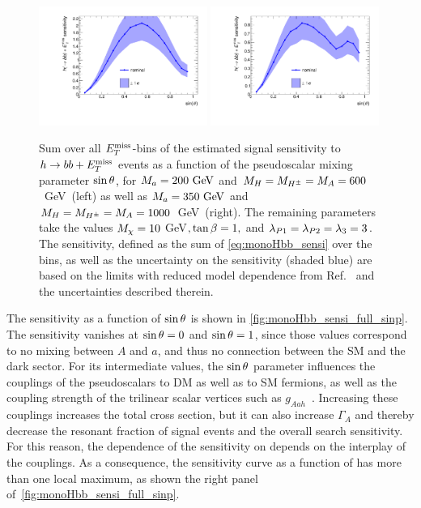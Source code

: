 \begin{figure}[tbp]
\centering
\includegraphics[width=0.49\textwidth]{texinputs/04_grid/figures/monoHbb_sinp_scan_1_sensi_1D.pdf}
\includegraphics[width=0.49\textwidth]{texinputs/04_grid/figures/monoHbb_sinp_scan_2_sensi_1D.pdf}
\caption[Sensitivity to $h\to bb + \MET$ signals with different $\sinp$, summed across $\MET$ bins]
{
Sum over all $\MET$-bins of the estimated signal sensitivity to $h\to bb + \MET$ events as a function of the pseudoscalar mixing parameter $\sinp$, for $M_{a} = 200~\textrm{GeV}$ and $M_{H}=M_{H^{\pm}}=M_{A} = 600$~GeV~(left) as well as $M_{a} = 350~\textrm{GeV}$ and $M_{H}=M_{H^{\pm}}=M_{A} = 1000$~GeV~(right). The remaining parameters take the values
$M_{\chi} = 10 $ GeV$, \tan\beta = 1,$ and $ \lambda_{P1} = \lambda_{P2} = \lambda_{3} = 3 $.
The sensitivity, defined as the sum of \autoref{eq:monoHbb_sensi} over the \met bins, as well as the uncertainty on the sensitivity (shaded blue) 
 are based on the limits with reduced model dependence from Ref.~\cite{Aaboud:2017yqz} and the uncertainties described therein. 
}
\label{fig:monoHbb_sensi_full_sinp}
\end{figure}

The sensitivity as a function of $\sinp$ is shown in \autoref{fig:monoHbb_sensi_full_sinp}.
The sensitivity vanishes at $\sin\theta=0$ and $\sin\theta=1$, since those values correspond to no mixing between $A$ and $a$, and thus no connection between the SM and the dark sector. 
For its intermediate values, the $\sinp$ parameter influences the couplings of the pseudoscalars to DM as well as to SM fermions, as well as the coupling strength of the trilinear scalar vertices such as $g_{Aah}$~\cite{Bauer:2017ota}. 
Increasing these couplings increases the total cross section, but it can also increase $\Gamma_A$ and thereby decrease the resonant fraction of signal events and the overall search sensitivity.
For this reason, the dependence of the sensitivity on \sinp depends on the interplay of the couplings.
As a consequence, the sensitivity curve as a function of \sinp has more than one local maximum, as shown the right panel of~\autoref{fig:monoHbb_sensi_full_sinp}. 

